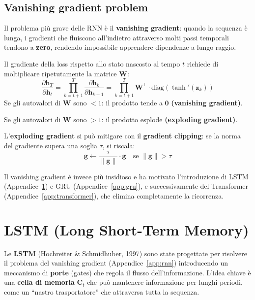 \documentclass[12pt,a4paper]{article}
\begin{document}
\subsection{Vanishing gradient problem}

Il problema pi\`u grave delle RNN \`e il \textbf{vanishing gradient}: quando la sequenza \`e lunga, i gradienti che fluiscono all'indietro attraverso molti passi temporali tendono a \textbf{zero}, rendendo impossibile apprendere dipendenze a lungo raggio.

\begin{formulabox}
Il gradiente della loss rispetto allo stato nascosto al tempo $t$ richiede di moltiplicare ripetutamente la matrice $\mathbf{W}$:
\[
    \frac{\partial \mathbf{h}_T}{\partial \mathbf{h}_t} = \prod_{k=t+1}^{T} \frac{\partial \mathbf{h}_k}{\partial \mathbf{h}_{k-1}} = \prod_{k=t+1}^{T} \mathbf{W}^\top \cdot \text{diag}\!\left(\tanh'(\mathbf{z}_k)\right)
\]
Se gli autovalori di $\mathbf{W}$ sono $< 1$: il prodotto tende a $\mathbf{0}$ \textbf{(vanishing gradient)}.

Se gli autovalori di $\mathbf{W}$ sono $> 1$: il prodotto esplode \textbf{(exploding gradient)}.
\end{formulabox}

L'\textbf{exploding gradient} si pu\`o mitigare con il \textbf{gradient clipping}: se la norma del gradiente supera una soglia $\tau$, si riscala:
\[
    \mathbf{g} \leftarrow \frac{\tau}{\|\mathbf{g}\|} \cdot \mathbf{g} \quad \text{se } \|\mathbf{g}\| > \tau
\]

Il vanishing gradient \`e invece pi\`u insidioso e ha motivato l'introduzione di LSTM (Appendice~\ref{app:lstm}) e GRU (Appendice~\ref{app:gru}), e successivamente del Transformer (Appendice~\ref{app:transformer}), che elimina completamente la ricorrenza.



\newpage
\section{LSTM (Long Short-Term Memory)} \label{app:lstm}

Le \textbf{LSTM} (Hochreiter \& Schmidhuber, 1997) sono state progettate per risolvere il problema del vanishing gradient (Appendice~\ref{app:rnn}) introducendo un meccanismo di \textbf{porte} (gates) che regola il flusso dell'informazione. L'idea chiave \`e una \textbf{cella di memoria} $\mathbf{C}_t$ che pu\`o mantenere informazione per lunghi periodi, come un ``nastro trasportatore'' che attraversa tutta la sequenza.
\end{document}
